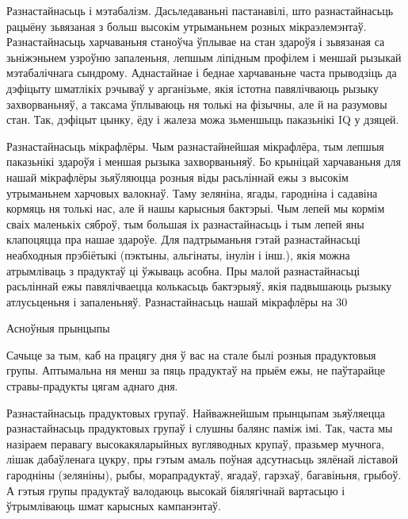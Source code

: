 Разнастайнасьць і мэтабалізм.
Дасьледаваньні пастанавілі, што разнастайнасьць рацыёну зьвязаная з больш высокім утрыманьнем розных мікраэлемэнтаў. Разнастайнасьць харчаваньня станоўча ўплывае на стан здароўя і зьвязаная са зьніжэньнем узроўню запаленьня, лепшым ліпідным профілем і меншай рызыкай мэтабалічнага сындрому. Аднастайнае і беднае харчаваньне часта прыводзіць да дэфіцыту шматлікіх рэчываў у арганізьме, якія істотна павялічваюць рызыку захворваньняў, а таксама ўплываюць ня толькі на фізычны, але й на разумовы стан. Так, дэфіцыт цынку, ёду і жалеза можа зьменшыць паказьнікі IQ у дзяцей.

Разнастайнасьць мікрафлёры.
Чым разнастайнейшая мікрафлёра, тым лепшыя паказьнікі здароўя і меншая рызыка захворваньняў. Бо крыніцай харчаваньня для нашай мікрафлёры зьяўляюцца розныя віды расьліннай ежы з высокім утрыманьнем харчовых валокнаў. Таму зеляніна, ягады, гародніна і садавіна кормяць ня толькі нас, але й нашы карысныя бактэрыі. Чым лепей мы кормім сваіх маленькіх сяброў, тым большая іх разнастайнасьць і тым лепей яны клапоцяцца пра нашае здароўе. Для падтрыманьня гэтай разнастайнасьці неабходныя прэбіётыкі (пэктыны, альгінаты, інулін і інш.), якія можна атрымліваць з прадуктаў ці ўжываць асобна. Пры малой разнастайнасьці расьліннай ежы павялічваецца колькасьць бактэрыяў, якія падвышаюць рызыку атлусьценьня і запаленьняў. Разнастайнасьць нашай мікрафлёры на 30%

Асноўныя прынцыпы

Сачыце за тым, каб на працягу дня ў вас на стале былі розныя прадуктовыя групы. Аптымальна ня менш за пяць прадуктаў на прыём ежы, не паўтарайце стравы-прадукты цягам аднаго дня.

Разнастайнасьць прадуктовых групаў.
Найважнейшым прынцыпам зьяўляецца разнастайнасьць прадуктовых групаў і слушны балянс паміж імі. Так, часта мы назіраем перавагу высокакяларыйных вугляводных крупаў, празьмер мучнога, лішак дабаўленага цукру, пры гэтым амаль поўная адсутнасьць зялёнай ліставой гародніны (зеляніны), рыбы, морапрадуктаў, ягадаў, гарэхаў, багавіньня, грыбоў. А гэтыя групы прадуктаў валодаюць высокай біялягічнай вартасьцю і ўтрымліваюць шмат карысных кампанэнтаў.

